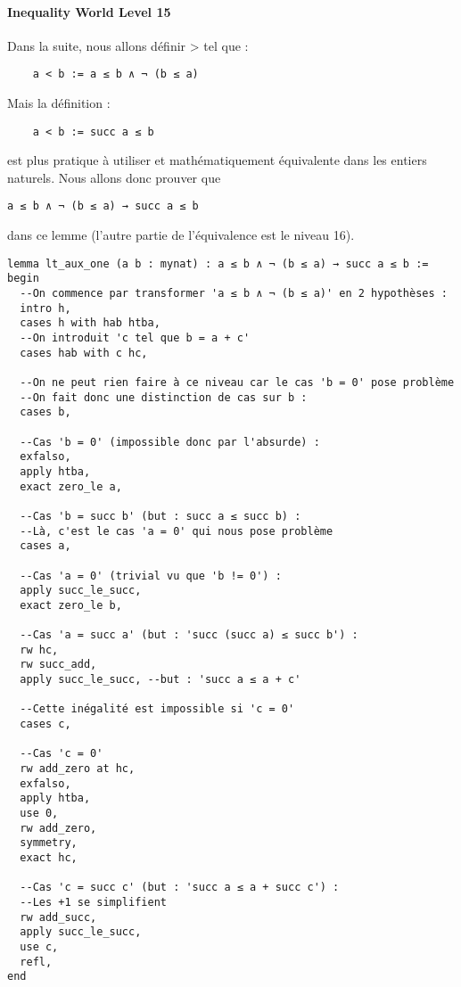 \paragraph{Inequality World Level 15}

Dans la suite, nous allons définir > tel que :
\begin{verbatim}
    a < b := a ≤ b ∧ ¬ (b ≤ a)
\end{verbatim}
Mais la définition :
\begin{verbatim}
    a < b := succ a ≤ b
\end{verbatim}
est plus pratique à utiliser et mathématiquement équivalente dans les entiers naturels.
Nous allons donc prouver  que 
\begin{verbatim}
a ≤ b ∧ ¬ (b ≤ a) → succ a ≤ b
\end{verbatim}
dans ce lemme (l'autre partie de l'équivalence est le niveau 16).

\begin{verbatim}
lemma lt_aux_one (a b : mynat) : a ≤ b ∧ ¬ (b ≤ a) → succ a ≤ b :=
begin
  --On commence par transformer 'a ≤ b ∧ ¬ (b ≤ a)' en 2 hypothèses :
  intro h,
  cases h with hab htba,
  --On introduit 'c tel que b = a + c'
  cases hab with c hc,

  --On ne peut rien faire à ce niveau car le cas 'b = 0' pose problème
  --On fait donc une distinction de cas sur b :
  cases b,

  --Cas 'b = 0' (impossible donc par l'absurde) :
  exfalso,
  apply htba,
  exact zero_le a,

  --Cas 'b = succ b' (but : succ a ≤ succ b) :
  --Là, c'est le cas 'a = 0' qui nous pose problème
  cases a,

  --Cas 'a = 0' (trivial vu que 'b != 0') :
  apply succ_le_succ,
  exact zero_le b,

  --Cas 'a = succ a' (but : 'succ (succ a) ≤ succ b') :
  rw hc,
  rw succ_add,
  apply succ_le_succ, --but : 'succ a ≤ a + c'
  
  --Cette inégalité est impossible si 'c = 0'
  cases c,

  --Cas 'c = 0'
  rw add_zero at hc,
  exfalso,
  apply htba,
  use 0,
  rw add_zero,
  symmetry,
  exact hc,

  --Cas 'c = succ c' (but : 'succ a ≤ a + succ c') :
  --Les +1 se simplifient
  rw add_succ,
  apply succ_le_succ,
  use c,
  refl,
end
\end{verbatim}